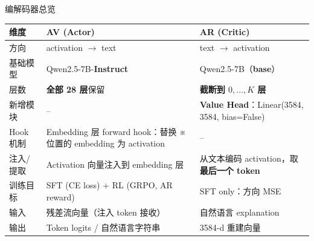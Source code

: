 \begin{frame}{编解码器总览}
\small
\begin{tabularx}{\linewidth}{lXX}
\toprule
维度 & AV (Actor) & AR (Critic) \\
\midrule
方向 & activation $\rightarrow$ text & text $\rightarrow$ activation \\
\midrule
基础模型 & Qwen2.5-7B-\textbf{Instruct} & Qwen2.5-7B（\textbf{base}）\\
层数 & \textbf{全部 28 层}保留 & \textbf{截断到 $0,...,K$ 层}\\
新增模块 & -- & \textbf{Value Head}：Linear(3584, 3584, bias=False) \\
Hook 机制 & Embedding 层 forward hook：替换 ※ 位置的 embedding 为 activation & -- \\
注入/提取 & Activation 向量注入到 embedding 层 & 从文本编码 activation，取\textbf{最后一个 token}\\
训练目标 & SFT (CE loss) + RL (GRPO, AR reward) & SFT only：方向 MSE \\
\midrule
输入 & 残差流向量（注入 token \code{※} 接收） & 自然语言 explanation \\
输出 & Token logits / 自然语言字符串 & 3584-d 重建向量 \\
\bottomrule
\end{tabularx}

\end{frame}
